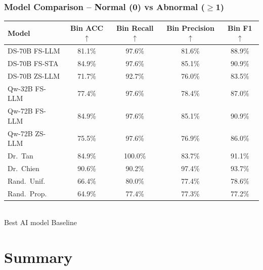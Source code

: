 \documentclass[aspectratio=169]{beamer}
\begin{document}
\begin{frame}
    \frametitle{Model Comparison -- Normal (0) vs Abnormal ($\geq$1)}
    \centering
    \small
    \renewcommand{\arraystretch}{1.3}
    \begin{tabular}{lcccc}
        \toprule
        \textbf{Model} & \textbf{Bin ACC}$\uparrow$ & \textbf{Bin Recall}$\uparrow$ & \textbf{Bin Precision}$\uparrow$ & \textbf{Bin F1}$\uparrow$ \\
        \midrule
        DS-70B FS-LLM & 81.1\% & \cellcolor{green!20}97.6\% & 81.6\% & 88.9\% \\
        DS-70B FS-STA & \cellcolor{green!20}84.9\% & \cellcolor{green!20}97.6\% & \cellcolor{green!20}85.1\% & \cellcolor{green!20}90.9\% \\
        DS-70B ZS-LLM & 71.7\% & 92.7\% & 76.0\% & 83.5\% \\
        Qw-32B FS-LLM & 77.4\% & \cellcolor{green!20}97.6\% & 78.4\% & 87.0\% \\
        Qw-72B FS-LLM & \cellcolor{green!20}84.9\% & \cellcolor{green!20}97.6\% & \cellcolor{green!20}85.1\% & \cellcolor{green!20}90.9\% \\
        Qw-72B ZS-LLM & 75.5\% & \cellcolor{green!20}97.6\% & 76.9\% & 86.0\% \\
        \midrule
        \rowcolor{orange!10} Dr.\ Tan    & 84.9\% & 100.0\% & 83.7\% & 91.1\% \\
        \rowcolor{orange!10} Dr.\ Chien  & 90.6\% & 90.2\%  & 97.4\% & 93.7\% \\
        \rowcolor{orange!10} Rand.\ Unif.& 66.4\% & 80.0\%  & 77.4\% & 78.6\% \\
        \rowcolor{orange!10} Rand.\ Prop.& 64.9\% & 77.4\%  & 77.3\% & 77.2\% \\
        \bottomrule
    \end{tabular}
    \\[0.3em]
    {\tiny {}\phantom{~X~} Best AI model \quad \colorbox{orange!10}{\phantom{~X~}} Baseline}
\end{frame}

\section{Summary}
\end{document}
